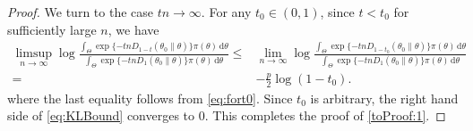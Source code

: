 \documentclass[11pt]{article}
\theoremstyle{plain}
\theoremstyle{definition}
\theoremstyle{remark}
\begin{document}
\begin{appendices}
\begin{proof}
We turn to the case $tn \to \infty$. 
For any $t_0 \in (0,1)$,
since $t < t_0$ for sufficiently large $n$, we have
\begin{align*}
    \limsup_{n \to \infty}
    \log
        \frac{
            \int_{\Theta} \exp \{-tn D_{1-t}(\theta_0 \| \theta)\} \pi (\theta) \, \mathrm d \theta
        }{
            \int_{\Theta} \exp \{-tn D_{1}(\theta_0 \| \theta)\} \pi (\theta) \, \mathrm d \theta
        }
        \leq&
    \lim_{n \to \infty}
\log
        \frac{
            \int_{\Theta} \exp \{-tn D_{1-t_0}(\theta_0 \| \theta)\} \pi (\theta) \, \mathrm d \theta
        }{
            \int_{\Theta} \exp \{-tn D_{1}(\theta_0 \| \theta)\} \pi (\theta) \, \mathrm d \theta
        }
        \\
 = &
 -\frac{p}{2}\log(1-t_0).
\end{align*}
where the last equality follows from \eqref{eq:fort0}.
Since $t_0$ is arbitrary, the right hand side of \eqref{eq:KLBound} converges to $0$.
This completes the proof of \eqref{toProof:1}.



\end{proof}
\end{appendices}
\end{document}
